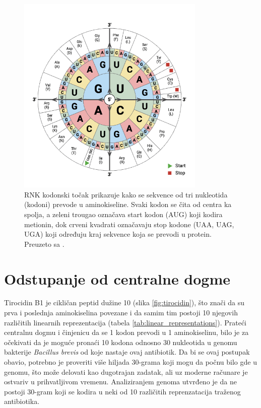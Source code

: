 \documentclass[12pt,oneside]{memoir}
\begin{document}
\begin{figure}[H]
  \centering
  \includegraphics[width=0.8\textwidth]{images/RNA-Codon-Wheel.png}
  \caption{RNK kodonski točak prikazuje kako se sekvence od tri nukleotida (kodoni) prevode u aminokiseline. Svaki kodon se čita od centra ka spolja, a zeleni trougao označava start kodon (AUG) koji kodira metionin, dok crveni kvadrati označavaju stop kodone (UAA, UAG, UGA) koji određuju kraj sekvence koja se prevodi u protein. Preuzeto sa \cite{codon_chart}.}
  \label{fig:codon-wheel}
\end{figure}


\section{Odstupanje od centralne dogme}
Tirocidin B1 je cikličan peptid dužine 10 (slika \ref{fig:tirocidin}), što znači da su prva i poslednja aminokiselina povezane i da samim tim postoji 10 njegovih različitih linearnih reprezentacija (tabela \ref{tab:linear_representations}). Prateći centralnu dogmu i činjenicu da se 1 kodon prevodi u 1 aminokiselinu, bilo je za očekivati da je moguće pronaći 10 kodona odnosno 30 nukleotida u genomu bakterije \emph{Bacillus brevis} od koje nastaje ovaj antibiotik. Da bi se ovaj postupak obavio, potrebno je proveriti više hiljada 30-grama koji mogu da počnu bilo gde u genomu, što može delovati kao dugotrajan zadatak, ali uz moderne računare je ostvariv u prihvatljivom vremenu. Analiziranjem genoma utvrđeno je da ne postoji 30-gram koji se kodira u neki od 10 različitih reprenzatacija traženog antibiotika.
\end{document}
